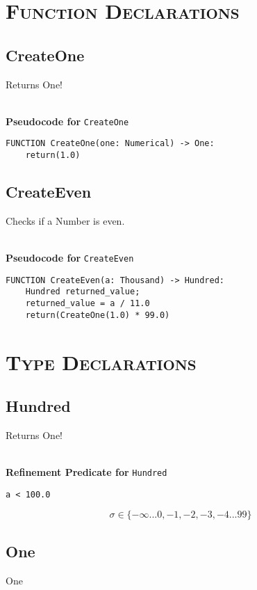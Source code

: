 
\section{\textsc{Function Declarations}}
\clearpage

\subsection{CreateOne}
Returns One!

\textbf{\\ Pseudocode for } \texttt{CreateOne}
\begin{verbatim}
FUNCTION CreateOne(one: Numerical) -> One:
	return(1.0)
\end{verbatim}

\clearpage

\subsection{CreateEven}
Checks if a Number is even.

\textbf{\\ Pseudocode for } \texttt{CreateEven}
\begin{verbatim}
FUNCTION CreateEven(a: Thousand) -> Hundred:
	Hundred returned_value;
	returned_value = a / 11.0
	return(CreateOne(1.0) * 99.0)
\end{verbatim}


\section{\textsc{Type Declarations}}

\subsection{Hundred}
Returns One!

\textbf{\\ Refinement Predicate for } \texttt{Hundred}
\begin{verbatim}
a < 100.0
\end{verbatim}

$$\sigma \in \{ -\infty ... 0, -1, -2, -3, -4 ... 99 \}$$

\subsection{One}
One

